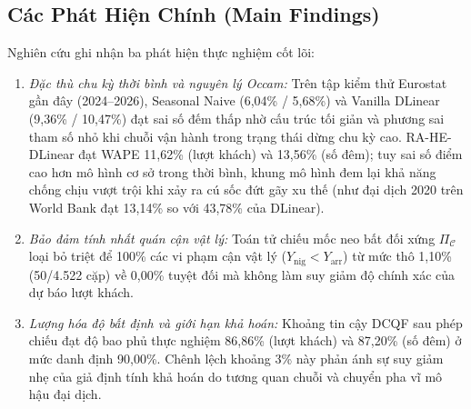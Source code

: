 \documentclass[10pt,journal,compsoc]{IEEEtran}
\begin{document}
\subsection{Các Phát Hiện Chính (Main Findings)}
Nghiên cứu ghi nhận ba phát hiện thực nghiệm cốt lõi:
\begin{enumerate}
    \item \textit{Đặc thù chu kỳ thời bình và nguyên lý Occam:} Trên tập kiểm thử Eurostat gần đây (2024--2026), Seasonal Naive (6,04\% / 5,68\%) và Vanilla DLinear (9,36\% / 10,47\%) đạt sai số đếm thấp nhờ cấu trúc tối giản và phương sai tham số nhỏ khi chuỗi vận hành trong trạng thái dừng chu kỳ cao. RA-HE-DLinear đạt WAPE 11,62\% (lượt khách) và 13,56\% (số đêm); tuy sai số điểm cao hơn mô hình cơ sở trong thời bình, khung mô hình đem lại khả năng chống chịu vượt trội khi xảy ra cú sốc đứt gãy xu thế (như đại dịch 2020 trên World Bank đạt 13,14\% so với 43,78\% của DLinear).
    \item \textit{Bảo đảm tính nhất quán cận vật lý:} Toán tử chiếu mốc neo bất đối xứng $\Pi_{\mathcal{C}}$ loại bỏ triệt để 100\% các vi phạm cận vật lý ($Y_{\text{nig}} < Y_{\text{arr}}$) từ mức thô 1,10\% (50/4.522 cặp) về 0,00\% tuyệt đối mà không làm suy giảm độ chính xác của dự báo lượt khách.
    \item \textit{Lượng hóa độ bất định và giới hạn khả hoán:} Khoảng tin cậy DCQF sau phép chiếu đạt độ bao phủ thực nghiệm 86,86\% (lượt khách) và 87,20\% (số đêm) ở mức danh định 90,00\%. Chênh lệch khoảng 3\% này phản ánh sự suy giảm nhẹ của giả định tính khả hoán do tương quan chuỗi và chuyển pha vĩ mô hậu đại dịch.
\end{enumerate}
\end{document}
